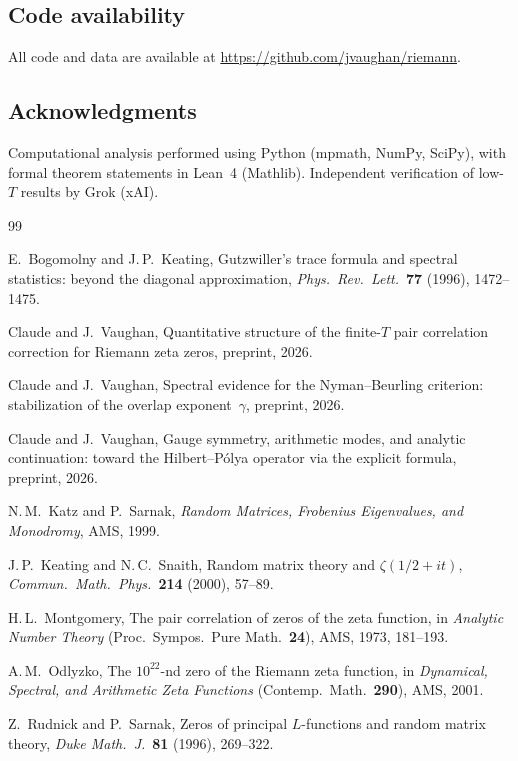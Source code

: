 \documentclass[11pt,a4paper]{article}
\begin{document}
\subsection*{Code availability}
All code and data are available at \url{https://github.com/jvaughan/riemann}.

\subsection*{Acknowledgments}
Computational analysis performed using Python (mpmath, NumPy, SciPy), with formal theorem statements in Lean~4 (Mathlib).
Independent verification of low-$T$ results by Grok (xAI).

\begin{thebibliography}{99}

E.~Bogomolny and J.\,P.~Keating,
Gutzwiller's trace formula and spectral statistics: beyond the diagonal approximation,
\emph{Phys.\ Rev.\ Lett.}\ \textbf{77} (1996), 1472--1475.

Claude and J.~Vaughan,
Quantitative structure of the finite-$T$ pair correlation correction for Riemann zeta zeros, preprint, 2026.

Claude and J.~Vaughan,
Spectral evidence for the Nyman--Beurling criterion: stabilization of the overlap exponent~$\gamma$, preprint, 2026.

Claude and J.~Vaughan,
Gauge symmetry, arithmetic modes, and analytic continuation: toward the Hilbert--P\'olya operator via the explicit formula, preprint, 2026.

N.\,M.~Katz and P.~Sarnak,
\emph{Random Matrices, Frobenius Eigenvalues, and Monodromy},
AMS, 1999.

J.\,P.~Keating and N.\,C.~Snaith,
Random matrix theory and $\zeta(1/2+it)$,
\emph{Commun.\ Math.\ Phys.}\ \textbf{214} (2000), 57--89.

H.\,L.~Montgomery,
The pair correlation of zeros of the zeta function,
in \emph{Analytic Number Theory} (Proc.\ Sympos.\ Pure Math.\ \textbf{24}), AMS, 1973, 181--193.

A.\,M.~Odlyzko,
The $10^{22}$-nd zero of the Riemann zeta function,
in \emph{Dynamical, Spectral, and Arithmetic Zeta Functions} (Contemp.\ Math.\ \textbf{290}), AMS, 2001.

Z.~Rudnick and P.~Sarnak,
Zeros of principal $L$-functions and random matrix theory,
\emph{Duke Math.\ J.}\ \textbf{81} (1996), 269--322.

\end{thebibliography}
\end{document}
